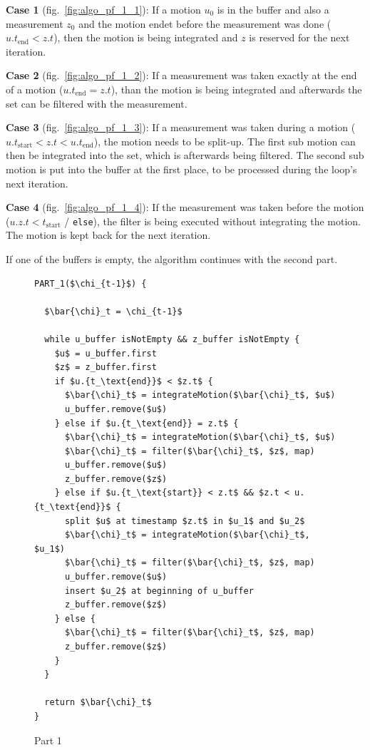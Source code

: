 \textbf{Case 1} (fig.\ \ref{fig:algo_pf_1_1}): If a motion $u_0$ is in the buffer and also a measurement $z_0$ and the motion endet before the measurement was done ($u.{t_\text{end}} < z.t$), then the motion is being integrated and $z$ is reserved for the next iteration.

\textbf{Case 2} (fig.\ \ref{fig:algo_pf_1_2}): If a measurement was taken exactly at the end of a motion ($u.{t_\text{end}} = z.t$), than the motion is being integrated and afterwards the set can be filtered with the measurement.

\textbf{Case 3} (fig.\ \ref{fig:algo_pf_1_3}): If a measurement was taken during a motion ($u.{t_\text{start}} < z.t < u.{t_\text{end}}$), the motion needs to be split-up. The first sub motion can then be integrated into the set, which is afterwards being filtered. The second sub motion is put into the buffer at the first place, to be processed during the loop's next iteration.

\textbf{Case 4} (fig.\ \ref{fig:algo_pf_1_4}): If the measurement was taken before the motion ($u.{z.t < t_\text{start}}$ / \texttt{else}), the filter is being executed without integrating the motion. The motion is kept back for the next iteration.

If one of the buffers is empty, the algorithm continues with the second part.

\begin{figure}
\begin{lstlisting}[mathescape]
PART_1($\chi_{t-1}$) {

  $\bar{\chi}_t = \chi_{t-1}$

  while u_buffer isNotEmpty && z_buffer isNotEmpty {
    $u$ = u_buffer.first
    $z$ = z_buffer.first
    if $u.{t_\text{end}}$ < $z.t$ {
      $\bar{\chi}_t$ = integrateMotion($\bar{\chi}_t$, $u$)
      u_buffer.remove($u$)
    } else if $u.{t_\text{end}} = z.t$ {
      $\bar{\chi}_t$ = integrateMotion($\bar{\chi}_t$, $u$)
      $\bar{\chi}_t$ = filter($\bar{\chi}_t$, $z$, map)
      u_buffer.remove($u$)
      z_buffer.remove($z$)
    } else if $u.{t_\text{start}} < z.t$ && $z.t < u.{t_\text{end}}$ {
      split $u$ at timestamp $z.t$ in $u_1$ and $u_2$
      $\bar{\chi}_t$ = integrateMotion($\bar{\chi}_t$, $u_1$)
      $\bar{\chi}_t$ = filter($\bar{\chi}_t$, $z$, map)
      u_buffer.remove($u$)
      insert $u_2$ at beginning of u_buffer
      z_buffer.remove($z$)
    } else {
      $\bar{\chi}_t$ = filter($\bar{\chi}_t$, $z$, map)
      z_buffer.remove($z$)
    }
  }
  
  return $\bar{\chi}_t$
}
\end{lstlisting}
\caption{Part 1}
\label{lst:algo_pf_1}
\end{figure}

